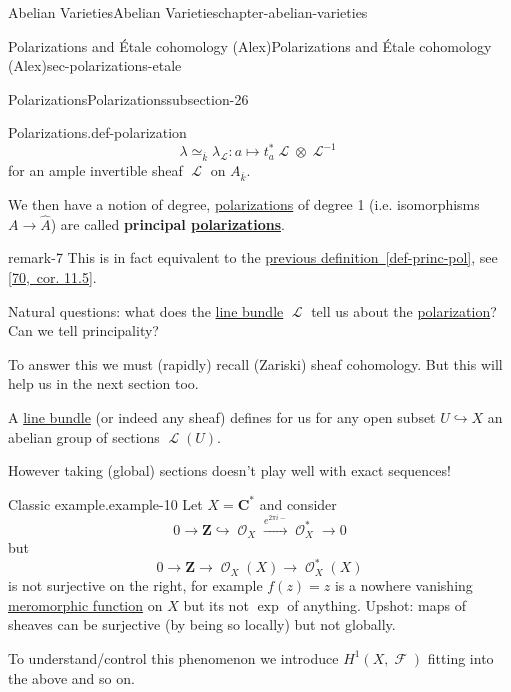 \documentclass[oneside,10pt,]{book}
\newcommand{\terminology}[1]{\textbf{#1}}
\numberwithin{equation}{section}
\newcommand{\sheaf}[1]{\operatorname{\mathcal{#1}}}
\newcommand{\ZZ}{\mathbf{Z}}
\newcommand{\CC}{\mathbf{C}}
\begin{document}
\begin{chapterptx}{Abelian Varieties}{}{Abelian Varieties}{}{}{chapter-abelian-varieties}
\begin{sectionptx}{Polarizations and Étale cohomology (Alex)}{}{Polarizations and Étale cohomology (Alex)}{}{}{sec-polarizations-etale}
\begin{subsectionptx}{Polarizations}{}{Polarizations}{}{}{subsection-26}
\begin{definition}{Polarizations.}{def-polarization}
\begin{equation*}
\lambda \simeq_{\overline k} \lambda_{\sheaf{L}} : a\mapsto t_a^*\sheaf L \otimes \sheaf L^{-1}
\end{equation*}
for an ample invertible sheaf \(\sheaf L\) on \(A_{\overline k}\).%
\par
\hypertarget{p-245}{}%
We then have a notion of degree, \hyperref[def-c-pol]{polarizations} of degree 1 (i.e. isomorphisms \(A\to \hat A\)) are called \terminology{principal \hyperref[def-c-pol]{polarizations}}.%
\end{definition}
\begin{remark}{}{remark-7}%
\hypertarget{p-246}{}%
This is in fact equivalent to the \hyperref[def-princ-pol]{previous definition~\ref{def-princ-pol}}, see \hyperlink{bib-vandergeer-moonen}{[70,~cor. 11.5]}.%
\end{remark}
\hypertarget{p-247}{}%
Natural questions: what does the \hyperref[def-line-bundle]{line bundle} \(\sheaf L\) tell us about the \hyperref[def-c-pol]{polarization}? Can we tell principality?%
\par
\hypertarget{p-248}{}%
To answer this we must (rapidly) recall (Zariski) sheaf cohomology. But this will help us in the next section too.%
\par
\hypertarget{p-249}{}%
A \hyperref[def-line-bundle]{line bundle} (or indeed any sheaf) defines for us for any open subset \(U \hookrightarrow X\) an abelian group of sections \(\sheaf L(U)\).%
\par
\hypertarget{p-250}{}%
However taking (global) sections doesn't play well with exact sequences!%
\begin{example}{Classic example.}{example-10}%
\hypertarget{p-251}{}%
Let \(X = \CC^*\) and consider%
\begin{equation*}
0 \to \ZZ \hookrightarrow \sheaf O_X \xrightarrow{e^{2\pi i -}} \sheaf O_X^* \to 0
\end{equation*}
but%
\begin{equation*}
0 \to \ZZ \to \sheaf O_X(X) \to \sheaf O_X^*(X)
\end{equation*}
is not surjective on the right, for example \(f(z) = z\) is a nowhere vanishing \hyperref[def-morph-riem-surf]{meromorphic function} on \(X\) but its not \(\exp\) of anything. Upshot: maps of sheaves can be surjective (by being so locally) but not globally.%
\end{example}
\hypertarget{p-252}{}%
To understand/control this phenomenon we introduce \(H^1(X, \sheaf F)\) fitting into the above and so on.%
\par
\hypertarget{p-253}{}%

\end{subsectionptx}
\end{sectionptx}
\end{chapterptx}
\end{document}
